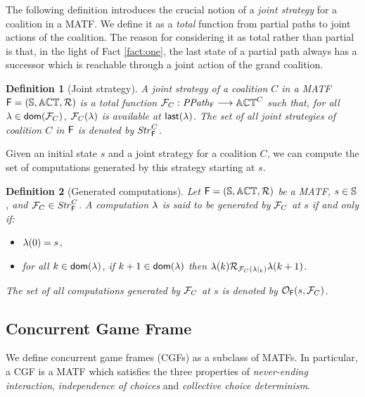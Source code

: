 \documentclass{article}
\newtheorem{definition}{Definition}
\begin{document}
The following definition introduces the crucial notion of a \emph{joint strategy} for a coalition in a MATF. 
We define it as a \emph{total} function from partial paths to joint actions of the coalition. 
The reason for considering it as total  rather than partial is that,
in the light of Fact \ref{fact:one}, 
the last state of a  partial path always has a successor which is reachable
through a joint action
of the grand  coalition.
\begin{definition}[Joint strategy]\label{def: joint strategy}
A \emph{joint strategy} of a coalition $C$ in a MATF $\mathsf{F} = (\mathbb{S}, \mathbb{ACT}, \mathcal{R})$
is a total  function $\mathcal{F}_C: \mathit{PPath}_{\mathsf{F}} \longrightarrow  \mathbb{ACT}^{C}$ such that,
 for all $\lambda \in \mathsf{dom}(\mathcal{F}_C)$, 
$\mathcal{F}_C(\lambda)$ is available at $\mathsf{last}(\lambda)$. 
The set of all joint strategies of coalition $C$ in $\mathsf{F}$ is denoted by $\mathit{Str}_{\mathsf{F}}^C$.    
\end{definition}



Given an initial state $s$ and a joint strategy for a coalition $C$, 
we can compute the set of computations generated by this strategy starting at $s$.

\begin{definition}[Generated computations]
Let $\mathsf{F} = (\mathbb{S}, \mathbb{ACT}, \mathcal{R})$ be a MATF, $s \in \mathbb{S}$, 
and $\mathcal{F}_{C} \in \mathit{Str}_{\mathsf{F}}^C$. 
A computation $\lambda$ is said to be \emph{generated} by $\mathcal{F}_{C}$ at $s$ if and only if:
\begin{itemize}
    \item $\lambda(0) = s$,
    \item 
    for all $k \in \mathsf{dom}(\lambda)$, 
    if $k+1 \in \mathsf{dom}(\lambda)$ then 
    $\lambda(k) \mathcal{R}_{\mathcal{F}_C(\lambda|_k)} \lambda(k+1)$.
\end{itemize}
The set of all computations generated  by $\mathcal{F}_{C}$ at $s$ is denoted by $\mathcal{O}_{\mathsf{F}}(s, \mathcal{F}_C)$.
\end{definition}


\subsection{Concurrent Game Frame }

We define concurrent game frames (CGFs)  as a subclass of MATFs. 
In particular, a CGF is a MATF which satisfies the three properties of
\emph{never-ending interaction},
\emph{independence of  choices}
and
\emph{collective choice  determinism}.
\end{document}
